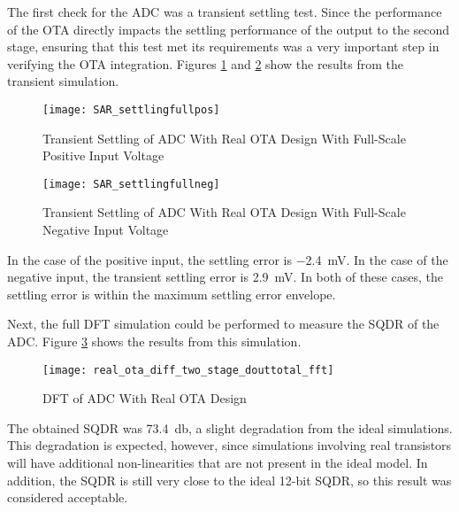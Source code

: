 The first check for the ADC was a transient settling test. Since the performance of the OTA directly impacts the settling performance of the output to the second stage, ensuring that this test met its requirements was a very important step in verifying the OTA integration. Figures \ref{fig:tranotapos} and \ref{fig:tranotaneg} show the results from the transient simulation.
\begin{figure}[htbp]
\centering
\texttt{[image: SAR\_settlingfullpos]}
\caption{Transient Settling of ADC With Real OTA Design With Full-Scale Positive Input Voltage} 
\label{fig:tranotapos}
\end{figure}
\begin{figure}[htbp]
\centering
\texttt{[image: SAR\_settlingfullneg]}
\caption{Transient Settling of ADC With Real OTA Design With Full-Scale Negative Input Voltage} 
\label{fig:tranotaneg}
\end{figure}
In the case of the positive input, the settling error is \SI{-2.4}{\milli\volt}. In the case of the negative input, the transient settling error is \SI{2.9}{\milli\volt}. In both of these cases, the settling error is within the maximum settling error envelope.

Next, the full DFT simulation could be performed to measure the SQDR of the ADC. Figure \ref{fig:realotasqdr} shows the results from this simulation. 
\begin{figure}[htbp]
\centering
\texttt{[image: real\_ota\_diff\_two\_stage\_douttotal\_fft]}
\caption{DFT of ADC With Real OTA Design } 
\label{fig:realotasqdr}
\end{figure}
The obtained SQDR was \SI{73.4}{\decibel}, a slight degradation from the ideal simulations. This degradation is expected, however, since simulations involving real transistors will have additional non-linearities that are not present in the ideal model. In addition, the SQDR is still very close to the ideal 12-bit SQDR, so this result was considered acceptable.

